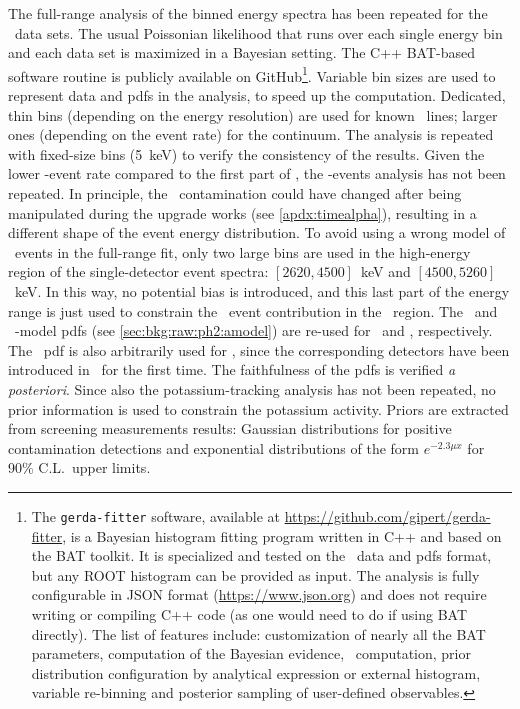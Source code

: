The full-range analysis of the binned energy spectra has been repeated for the \phasetwop\
data sets. The usual Poissonian likelihood that runs over each single energy bin and each
data set is maximized in a Bayesian setting. The C++ BAT-based~\cite{Caldwell2008}
software routine is publicly available on GitHub\footnote{\label{footnote:gerda-fitter}%
  The \texttt{gerda-fitter} software, available at
  \url{https://github.com/gipert/gerda-fitter}, is a Bayesian histogram fitting program
  written in C++ and based on the BAT toolkit. It is specialized and tested on the \gerda\
  data and pdfs format, but any ROOT histogram can be provided as input. The analysis is
  fully configurable in JSON format (\url{https://www.json.org}) and does not require
  writing or compiling C++ code (as one would need to do if using BAT directly). The list
  of features include: customization of nearly all the BAT parameters, computation of the
  Bayesian evidence, \pvalue\ computation, prior distribution configuration by
  analytical expression or external histogram, variable re-binning and posterior sampling of
  user-defined observables.
}. Variable bin sizes are used to represent data and pdfs in the analysis, to speed up the
computation. Dedicated, thin bins (depending on the energy resolution) are used for known
\g\ lines; larger ones (depending on the event rate) for the continuum. The analysis is
repeated with fixed-size bins (5~keV) to verify the consistency of the results.
\newpar
Given the lower \a-event rate compared to the first part of \phasetwo, the \a-events
analysis has not been repeated. In principle, the \Po\ contamination could have changed
after being manipulated during the upgrade works (see \cref{apdx:timealpha}), resulting in
a different shape of the event energy distribution. To avoid using a wrong model of \a\
events in the full-range fit, only two large bins are used in the high-energy region of
the single-detector event spectra: $[2620, 4500]$~keV and $[4500, 5260]$~keV. In this way,
no potential bias is introduced, and this last part of the energy range is just used to
constrain the \a\ event contribution in the \nnbb\ region. The \enrBEGeII\ and \enrCoaxII\
\a-model pdfs (see \cref{sec:bkg:raw:ph2:amodel}) are re-used for \enrBEGeIIp\ and
\enrSCoaxIIp, respectively. The \enrBEGeII\ pdf is also arbitrarily used for \enrICoaxIIp,
since the corresponding detectors have been introduced in \phasetwop\ for the first time.
The faithfulness of the pdfs is verified \emph{a posteriori}.
\newpar
Since also the potassium-tracking analysis has not been repeated, no prior information is
used to constrain the potassium activity. Priors are extracted from screening
measurements results: Gaussian distributions for positive contamination detections and
exponential distributions of the form $e^{-2.3 \mu x}$ for 90\% C.L.~upper limits.

